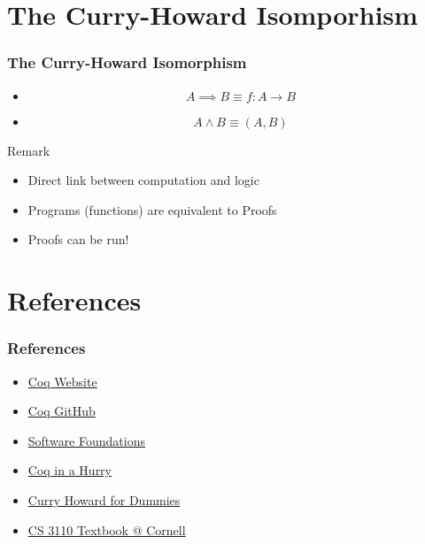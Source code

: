 \documentclass{beamer}
\begin{document}
\section{The Curry-Howard Isomporhism}
\begin{frame}
\frametitle{The Curry-Howard Isomorphism}
\begin{theorem}
\end{theorem}

\begin{examples}
    \begin{itemize}
        \item $$A \implies B \equiv f: A \to B$$
        \item $$A \wedge B \equiv (A, B)$$
    \end{itemize}
\end{examples}

\begin{block}{Remark}
    \begin{itemize}
    \item Direct link between computation and logic
    \item Programs (functions) are equivalent to Proofs
    \item Proofs can be run!
    \end{itemize}
\end{block}
\end{frame}

\section{References}
\begin{frame}
\frametitle{References}
    \begin{itemize}
        \item \href{https://coq.inria.fr/}{Coq Website}
        \item \href{https://github.com/coq/coq}{Coq GitHub}
        \item \href{https://softwarefoundations.cis.upenn.edu/lf-current/toc.html}{Software Foundations}
        \item \href{https://cel.hal.science/inria-00001173v6/document}{Coq in a Hurry}
        \item \href{https://www.rocq.inria.fr/semdoc/Presentations/20150217_PierreMariePedrot.pdf}{Curry Howard for Dummies}
        \item \href{https://cs3110.github.io/textbook/chapters/adv/curry-howard.html}{CS 3110 Textbook @ Cornell}
    \end{itemize}
\end{frame}
\end{document}
